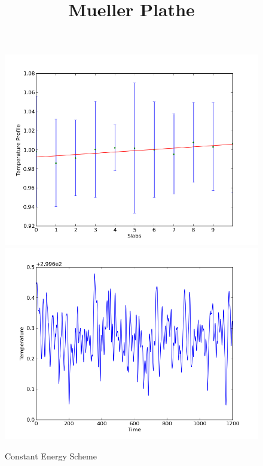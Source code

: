 \documentclass[12pt,a4paper]{article}
\author{}
\date{}
\title{Mueller Plathe}
\begin{document}
\maketitle
\paragraph{} 
\begin{figure}[h]
  \includegraphics[width=\linewidth]{TemperatureProfile_a.png}
\endminipage\hfill
{}
  \includegraphics[width=\linewidth]{TemperatureEvolution_a.png}
\endminipage\hfill
\caption{Constant Energy Scheme}
\end{figure}
\end{document}
